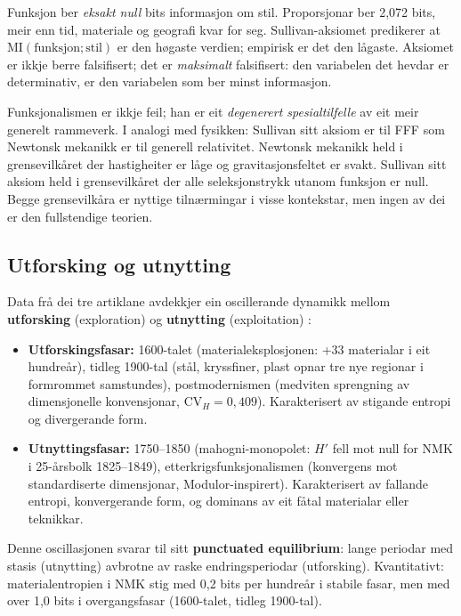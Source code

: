 \documentclass[10pt, a4paper, twocolumn]{article}
\begin{document}
Funksjon ber \emph{eksakt null} bits informasjon om stil. Proporsjonar ber 2,072 bits, meir enn tid, materiale og geografi kvar for seg. Sullivan-aksiomet predikerer at $\text{MI}(\text{funksjon}; \text{stil})$ er den høgaste verdien; empirisk er det den lågaste. Aksiomet er ikkje berre falsifisert; det er \emph{maksimalt} falsifisert: den variabelen det hevdar er determinativ, er den variabelen som ber minst informasjon.

Funksjonalismen er ikkje feil; han er eit \emph{degenerert spesialtilfelle} av eit meir generelt rammeverk. I analogi med fysikken: Sullivan sitt aksiom er til FFF som Newtonsk mekanikk er til generell relativitet. Newtonsk mekanikk held i grensevilkåret der hastigheiter er låge og gravitasjonsfeltet er svakt. Sullivan sitt aksiom held i grensevilkåret der alle seleksjonstrykk utanom funksjon er null. Begge grensevilkåra er nyttige tilnærmingar i visse kontekstar, men ingen av dei er den fullstendige teorien.


\subsection{Utforsking og utnytting}

Data frå dei tre artiklane avdekkjer ein oscillerande dynamikk mellom \textbf{utforsking} (exploration) og \textbf{utnytting} (exploitation) \citep{sutton2018}:

\begin{itemize}
  \item \textbf{Utforskingsfasar:} 1600-talet (materialeksplosjonen: +33 materialar i eit hundreår), tidleg 1900-tal (stål, kryssfiner, plast opnar tre nye regionar i formrommet samstundes), postmodernismen (medviten sprengning av dimensjonelle konvensjonar, $\text{CV}_H = 0{,}409$). Karakterisert av stigande entropi og divergerande form.
  \item \textbf{Utnyttingsfasar:} 1750--1850 (mahogni-monopolet: $H'$ fell mot null for NMK i 25-årsbolk 1825--1849), etterkrigsfunksjonalismen (konvergens mot standardiserte dimensjonar, Modulor-inspirert). Karakterisert av fallande entropi, konvergerande form, og dominans av eit fåtal materialar eller teknikkar.
\end{itemize}

Denne oscillasjonen svarar til \citet{eldredge1972} sitt \textbf{punctuated equilibrium}: lange periodar med stasis (utnytting) avbrotne av raske endringsperiodar (utforsking). Kvantitativt: materialentropien i NMK stig med 0,2 bits per hundreår i stabile fasar, men med over 1,0 bits i overgangsfasar (1600-talet, tidleg 1900-tal).
\end{document}

